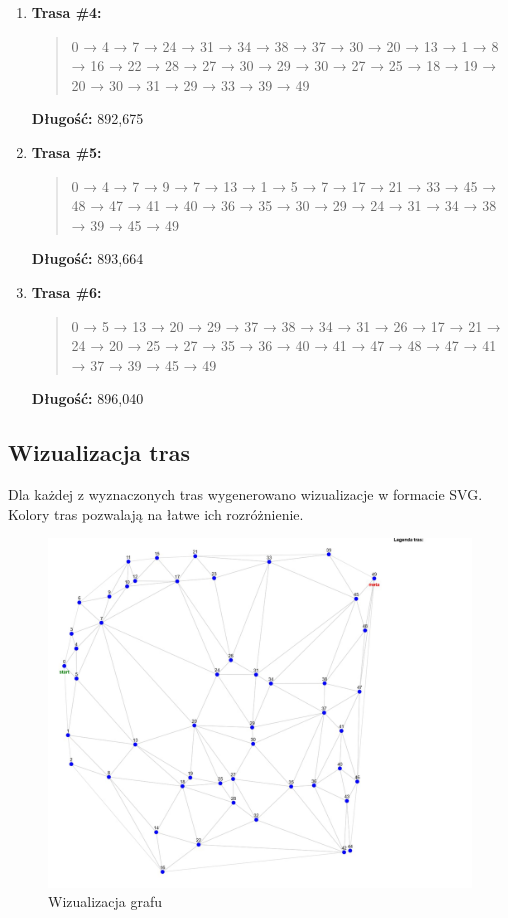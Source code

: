\documentclass{article}
\begin{document}
\begin{enumerate}
    \item \textbf{Trasa \#4:}
    \begin{quote}
        0 → 4 → 7 → 24 → 31 → 34 → 38 → 37 → 30 → 20 → 13 → 1 → 8 → 16 → 22 → 28 → 27 → 30 → 29 → 30 → 27 → 25 → 18 → 19 → 20 → 30 → 31 → 29 → 33 → 39 → 49
    \end{quote}
    \textbf{Długość:} 892{,}675

    \item \textbf{Trasa \#5:}
    \begin{quote}
        0 → 4 → 7 → 9 → 7 → 13 → 1 → 5 → 7 → 17 → 21 → 33 → 45 → 48 → 47 → 41 → 40 → 36 → 35 → 30 → 29 → 24 → 31 → 34 → 38 → 39 → 45 → 49
    \end{quote}
    \textbf{Długość:} 893{,}664

    \item \textbf{Trasa \#6:}
    \begin{quote}
        0 → 5 → 13 → 20 → 29 → 37 → 38 → 34 → 31 → 26 → 17 → 21 → 24 → 20 → 25 → 27 → 35 → 36 → 40 → 41 → 47 → 48 → 47 → 41 → 37 → 39 → 45 → 49
    \end{quote}
    \textbf{Długość:} 896{,}040
\end{enumerate}

\subsection*{Wizualizacja tras}

Dla każdej z wyznaczonych tras wygenerowano wizualizacje w formacie SVG. Kolory tras pozwalają na łatwe ich rozróżnienie.

\begin{figure}[H]
    \centering
    \includegraphics[width=1\linewidth]{277F47CA-3920-4B86-AFE1-1EB9FF95EBFC.png}
    \caption{Wizualizacja grafu}
    \label{fig:enter-label}
\end{figure}
\end{document}
